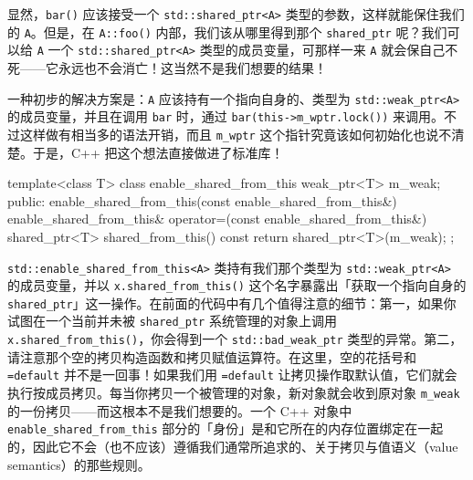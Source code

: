 显然，\texttt{bar(\allowbreak{})\allowbreak{}} 应该接受一个 \texttt{std::\allowbreak{}shared\_\allowbreak{}ptr<\allowbreak{}A>\allowbreak{}} 类型的参数，这样就能保住我们的 \texttt{A}。但是，在 \texttt{A::\allowbreak{}foo(\allowbreak{})\allowbreak{}} 内部，我们该从哪里得到那个 \texttt{shared\_\allowbreak{}ptr} 呢？我们可以给 \texttt{A} 一个 \texttt{std::\allowbreak{}shared\_\allowbreak{}ptr<\allowbreak{}A>\allowbreak{}} 类型的成员变量，可那样一来 \texttt{A} 就会保自己不死——它永远也不会消亡！这当然不是我们想要的结果！

一种初步的解决方案是：\texttt{A} 应该持有一个指向自身的、类型为 \texttt{std::\allowbreak{}weak\_\allowbreak{}ptr<\allowbreak{}A>\allowbreak{}} 的成员变量，并且在调用 \texttt{bar} 时，通过 \texttt{bar(\allowbreak{}this->m\_\allowbreak{}wptr.\allowbreak{}lock(\allowbreak{})\allowbreak{})\allowbreak{}} 来调用。不过这样做有相当多的语法开销，而且 \texttt{m\_\allowbreak{}wptr} 这个指针究竟该如何初始化也说不清楚。于是，C++ 把这个想法直接做进了标准库！

\begin{codebox}[cpp]
    template<class T>
    class enable_shared_from_this {
      weak_ptr<T> m_weak;
    public:
      enable_shared_from_this(const enable_shared_from_this&) {}
      enable_shared_from_this& operator=(const enable_shared_from_this&) {}
      shared_ptr<T> shared_from_this() const {
        return shared_ptr<T>(m_weak);
      }
    };
\end{codebox}

\texttt{std::\allowbreak{}enable\_\allowbreak{}shared\_\allowbreak{}from\_\allowbreak{}this<\allowbreak{}A>\allowbreak{}} 类持有我们那个类型为 \texttt{std::\allowbreak{}weak\_\allowbreak{}ptr<\allowbreak{}A>\allowbreak{}} 的成员变量，并以 \texttt{x.\allowbreak{}shared\_\allowbreak{}from\_\allowbreak{}this(\allowbreak{})\allowbreak{}} 这个名字暴露出「获取一个指向自身的 \texttt{shared\_\allowbreak{}ptr}」这一操作。在前面的代码中有几个值得注意的细节：第一，如果你试图在一个当前并未被 \texttt{shared\_\allowbreak{}ptr} 系统管理的对象上调用 \texttt{x.\allowbreak{}shared\_\allowbreak{}from\_\allowbreak{}this(\allowbreak{})\allowbreak{}}，你会得到一个 \texttt{std::\allowbreak{}bad\_\allowbreak{}weak\_\allowbreak{}ptr} 类型的异常。第二，请注意那个空的拷贝构造函数和拷贝赋值运算符。在这里，空的花括号和 \texttt{=default} 并不是一回事！如果我们用 \texttt{=default} 让拷贝操作取默认值，它们就会执行按成员拷贝。每当你拷贝一个被管理的对象，新对象就会收到原对象 \texttt{m\_\allowbreak{}weak} 的一份拷贝——而这根本不是我们想要的。一个 C++ 对象中 \texttt{enable\_\allowbreak{}shared\_\allowbreak{}from\_\allowbreak{}this} 部分的「身份」是和它所在的内存位置绑定在一起的，因此它不会（也不应该）遵循我们通常所追求的、关于拷贝与值语义（value semantics）的那些规则。

